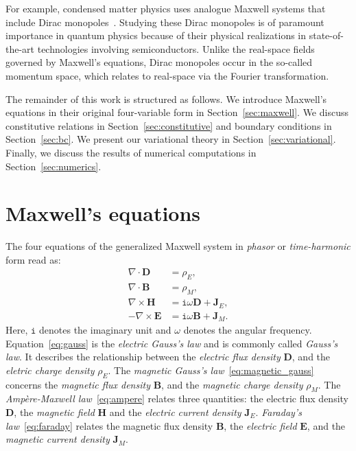 \documentclass[journal,transmag]{IEEEtran}
\newcommand*\VF[1]{\mathbf{#1}}
\newcommand*\iunit{\mathtt{i}}
\begin{document}
For example, condensed matter physics uses analogue Maxwell systems that include Dirac monopoles~\cite{gangaraj2017berry}. 
Studying these Dirac monopoles is of paramount importance in quantum physics 
because of their physical realizations in state-of-the-art technologies involving semiconductors.
Unlike the real-space fields governed by Maxwell's equations,
Dirac monopoles occur in the so-called momentum space, which relates to real-space via the Fourier transformation.








The remainder of this work is structured as follows.
We introduce Maxwell's equations in their original four-variable form in Section~\ref{sec:maxwell}.
We discuss constitutive relations in Section~\ref{sec:constitutive}
and boundary conditions in Section~\ref{sec:bc}.
We present our variational theory in Section~\ref{sec:variational}. 
Finally, we discuss the results of numerical computations in Section~\ref{sec:numerics}.






\section{\label{sec:maxwell} Maxwell's equations}
The four equations of the generalized Maxwell system in \emph{phasor} or \emph{time-harmonic} form read as:
\begin{align} 
 \label{eq:gauss}
 \nabla\cdot{\VF{D}} &={\rho}_{E}, \\
 \label{eq:magnetic_gauss}
 \nabla\cdot{\VF{B}} &={\rho}_{M}, \\
 \label{eq:ampere}
 \nabla\times{\VF{H}} &= \iunit \omega{\VF{D}}  + {\VF{J}}_{E}, \\
 \label{eq:faraday} 
 - \nabla\times{\VF{E}} &= \iunit \omega{\VF{B}} + {\VF{J}}_{M}.
\end{align} 
Here, $\iunit$ denotes the imaginary unit and $\omega$ denotes the angular frequency. 
Equation~\eqref{eq:gauss} is the \emph{electric Gauss's law} 
and is commonly called \emph{Gauss's law}.
It describes the relationship 
between the \emph{electric flux density} $\VF{D}$,
and the \emph{eletric charge density} $\rho_{E}$.  
The \emph{magnetic Gauss's law}~\eqref{eq:magnetic_gauss} concerns 
the \emph{magnetic flux density} $\VF{B}$,
and the \emph{magnetic charge density} $\rho_{M}$.
The \emph{Amp\`ere-Maxwell law}~\eqref{eq:ampere}
relates three quantities:
the electric flux density $\VF{D}$,
the \emph{magnetic field} $\VF{H}$
and the \emph{electric current density} $\VF{J}_{E}$. 
\emph{Faraday's law}~\eqref{eq:faraday} relates 
the magnetic flux density $\VF{B}$,
the \emph{electric field} $\VF{E}$,
and the \emph{magnetic current density} $\VF{J}_{M}$. 
\end{document}
